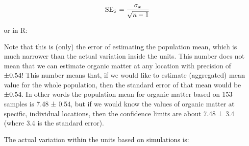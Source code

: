 \documentclass[11pt]{krantz}
\newenvironment{Shaded}{\begin{snugshade}}{\end{snugshade}}
\newcommand{\CommentTok}[1]{\textcolor[rgb]{0.37,0.37,0.37}{\textit{#1}}}
\newcommand{\ControlFlowTok}[1]{\textcolor[rgb]{0.27,0.27,0.27}{\textbf{#1}}}
\newcommand{\DataTypeTok}[1]{\textcolor[rgb]{0.27,0.27,0.27}{#1}}
\newcommand{\DecValTok}[1]{\textcolor[rgb]{0.06,0.06,0.06}{#1}}
\newcommand{\FloatTok}[1]{\textcolor[rgb]{0.06,0.06,0.06}{#1}}
\newcommand{\KeywordTok}[1]{\textcolor[rgb]{0.27,0.27,0.27}{\textbf{#1}}}
\newcommand{\NormalTok}[1]{#1}
\newcommand{\OperatorTok}[1]{\textcolor[rgb]{0.43,0.43,0.43}{\textbf{#1}}}
\newcommand{\OtherTok}[1]{\textcolor[rgb]{0.37,0.37,0.37}{#1}}
\newcommand{\StringTok}[1]{\textcolor[rgb]{0.5,0.5,0.5}{#1}}
\theoremstyle{definition}
\theoremstyle{definition}
\theoremstyle{definition}
\theoremstyle{remark}
\begin{document}
\begin{equation}
{\rm{SE}}_{\bar{x}} = \frac{\sigma_x}{\sqrt{n-1}}
\label{eq:mean-pop}
\end{equation}

or in R:

\begin{Shaded}
\end{Shaded}

Note that this is (only) the error of estimating the population mean,
which is much narrower than the actual variation inside the units. This
number does not mean that we can estimate organic matter at any location
with precision of ±0.54! This number means that, if we would like to
estimate (aggregated) mean value for the whole population, then the
standard error of that mean would be ±0.54. In other words the
population mean for organic matter based on 153 samples is 7.48 ± 0.54,
but if we would know the values of organic matter at specific,
individual locations, then the confidence limits are about 7.48 ± 3.4
(where 3.4 is the standard error).

The actual variation within the units based on simulations is:

\begin{Shaded}
\end{Shaded}
\end{document}
